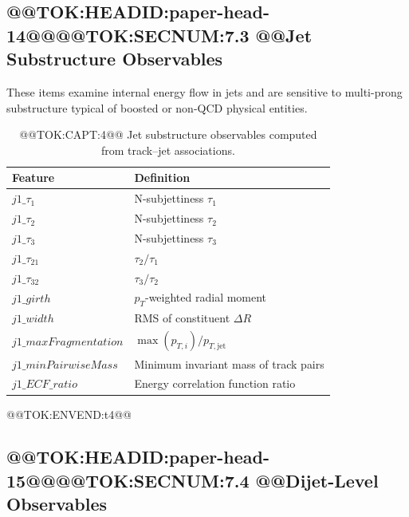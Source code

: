 \documentclass[11pt]{article}
\begin{document}
\subsection{@@TOK:HEADID:paper-head-14@@@@TOK:SECNUM:7.3 @@Jet Substructure Observables}
These items examine internal energy flow in jets and are sensitive to multi-prong substructure typical of boosted or non-QCD physical entities.
\begin{table}[h]
\centering
\caption{@@TOK:CAPT:4@@ Jet substructure observables computed from track--jet associations.}
\footnotesize

\begin{tabular}{ll}
\toprule
Feature & Definition \\
\midrule
$j1\_\tau_1$ & N-subjettiness $\tau_1$ \\
$j1\_\tau_2$ & N-subjettiness $\tau_2$ \\
$j1\_\tau_3$ & N-subjettiness $\tau_3$ \\
$j1\_\tau_{21}$ & $\tau_2 / \tau_1$ \\
$j1\_\tau_{32}$ & $\tau_3 / \tau_2$ \\
$j1\_girth$ & $p_T$-weighted radial moment \\
$j1\_width$ & RMS of constituent $\Delta R$ \\
$j1\_maxFragmentation$ & $\max(p_{T,i}) / p_{T,\text{jet}}$ \\
$j1\_minPairwiseMass$ & Minimum invariant mass of track pairs \\
$j1\_ECF\_ratio$ & Energy correlation function ratio \\
\bottomrule
\end{tabular}

@@TOK:ENVEND:t4@@\end{table}

\subsection{@@TOK:HEADID:paper-head-15@@@@TOK:SECNUM:7.4 @@Dijet-Level Observables}
\end{document}
